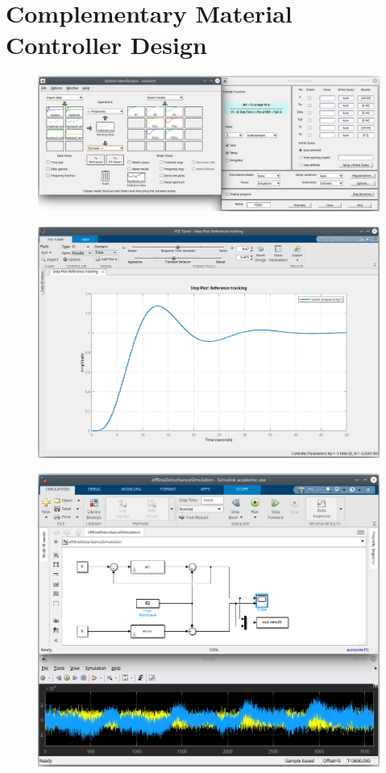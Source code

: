 \section{Complementary Material Controller Design}

\begin{figure}[tb]
	\centering
	\includegraphics[width=\textwidth]{chap/Appendix/ControllerDesign/identi}
	\caption{}
	\label{fig:Appendix-identify}
\end{figure}

\begin{figure}[tb]
	\centering
	\includegraphics[width=\textwidth]{chap/Appendix/ControllerDesign/pidTuner}
	\caption{}
	\label{fig:Appendix-pidTuner}
\end{figure}

\begin{figure}[tb]
	\centering
	\includegraphics[width=\textwidth]{chap/Appendix/ControllerDesign/simulink}
	\caption{}
	\label{fig:Appendix-simuliunk}
\end{figure}